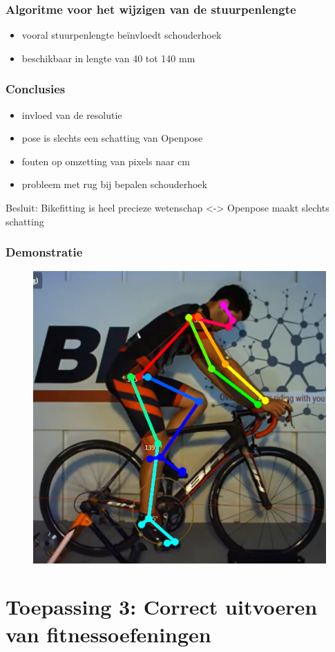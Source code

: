 \documentclass
   [kulak] %
   {kulakbeamer}
\begin{document}
\begin{frame}
	\frametitle{Algoritme voor het wijzigen van de stuurpenlengte}
	\begin{itemize}
		\item vooral stuurpenlengte beïnvloedt schouderhoek
		\item beschikbaar in lengte van 40 tot 140 \si{mm}
		
	\end{itemize}
\end{frame}

\begin{frame}
	\frametitle{Conclusies}
	\begin{itemize}
		\item invloed van de resolutie
		\item pose is slechts een schatting van Openpose
		\item fouten op omzetting van pixels naar \si{cm}
		\item probleem met rug bij bepalen schouderhoek
	\end{itemize}
Besluit: Bikefitting is heel precieze wetenschap <-> Openpose maakt slechts schatting
\end{frame}

\begin{frame}
	\frametitle{Demonstratie}
	\begin{figure}
		\includegraphics[width= .55\textwidth]{prof_bikefit}
	\end{figure}
\end{frame}



\section{Toepassing 3: Correct uitvoeren van fitnessoefeningen}
\end{document}
